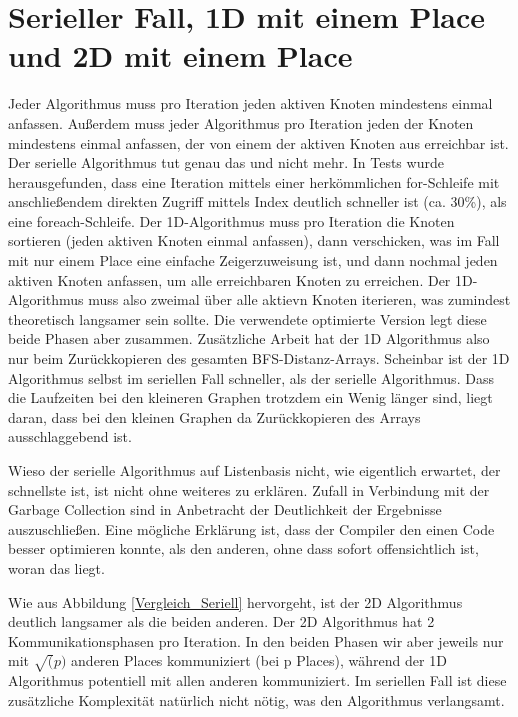 \section{Serieller Fall, 1D mit einem Place und 2D mit einem Place} %
\label{sec:serieller_fall_vs_1d_mit_einem_place}
Jeder Algorithmus muss pro Iteration jeden aktiven Knoten mindestens einmal anfassen. Außerdem muss jeder Algorithmus pro Iteration jeden der Knoten mindestens einmal anfassen, der von einem der aktiven Knoten aus erreichbar ist. Der serielle Algorithmus tut genau das und nicht mehr. In Tests wurde herausgefunden, dass eine Iteration mittels einer herkömmlichen for-Schleife mit anschließendem direkten Zugriff mittels Index deutlich schneller ist (ca. 30\%), als eine foreach-Schleife. Der 1D-Algorithmus muss pro Iteration die Knoten sortieren (jeden aktiven Knoten einmal anfassen), dann verschicken, was im Fall mit nur einem Place eine einfache Zeigerzuweisung ist, und dann nochmal jeden aktiven Knoten anfassen, um alle erreichbaren Knoten zu erreichen. Der 1D-Algorithmus muss also zweimal über alle aktievn Knoten iterieren, was zumindest theoretisch langsamer sein sollte. Die verwendete optimierte Version legt diese beide Phasen aber zusammen. Zusätzliche Arbeit hat der 1D Algorithmus also nur beim Zurückkopieren des gesamten BFS-Distanz-Arrays. Scheinbar ist der 1D Algorithmus selbst im seriellen Fall schneller, als der serielle Algorithmus. Dass die Laufzeiten bei den kleineren Graphen trotzdem ein Wenig länger sind, liegt daran, dass bei den kleinen Graphen da Zurückkopieren des Arrays ausschlaggebend ist.

Wieso der serielle Algorithmus auf Listenbasis nicht, wie eigentlich erwartet, der schnellste ist, ist nicht ohne weiteres zu erklären. Zufall in Verbindung mit der Garbage Collection sind in Anbetracht der Deutlichkeit der Ergebnisse auszuschließen. Eine mögliche Erklärung ist, dass der Compiler den einen Code besser optimieren konnte, als den anderen, ohne dass sofort offensichtlich ist, woran das liegt.

Wie aus Abbildung \ref{Vergleich_Seriell} hervorgeht, ist der 2D Algorithmus deutlich langsamer als die beiden anderen. Der 2D Algorithmus hat 2 Kommunikationsphasen pro Iteration. In den beiden Phasen wir aber jeweils nur mit $\sqrt(p)$ anderen Places kommuniziert (bei p Places)\cite{Buluc:2011}, während der 1D Algorithmus potentiell mit allen anderen kommuniziert. Im seriellen Fall ist diese zusätzliche Komplexität natürlich nicht nötig, was den Algorithmus verlangsamt.

